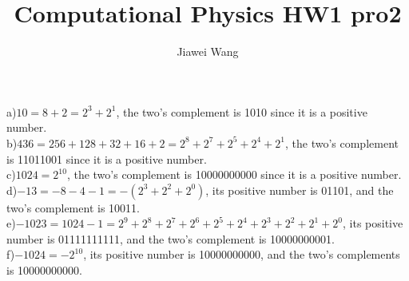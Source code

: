 \documentclass[a4paper,12pt]{article}
\begin{document}
\title{Computational Physics HW1 pro2}
\author{Jiawei Wang}
\date{}
\maketitle

\noindent a)$10=8+2=2^3+2^1$, the two's complement is 1010 since it is a positive number.\\
b)$436=256+128+32+16+2=2^8+2^7+2^5+2^4+2^1$, the two's complement is 11011001 since it is a positive number.\\
c)$1024=2^10$, the two's complement is 10000000000 since it is a positive number.\\
d)$-13=-8-4-1=-(2^3+2^2+2^0)$, its positive number is 01101, and the two's complement is 10011.\\
e)$-1023=1024-1=2^9+2^8+2^7+2^6+2^5+2^4+2^3+2^2+2^1+2^0$, its positive number is 01111111111, and the two's complement is 10000000001.\\
f)$-1024=-2^10$, its positive number is 10000000000, and the two's complements is 10000000000.
\end{document}
